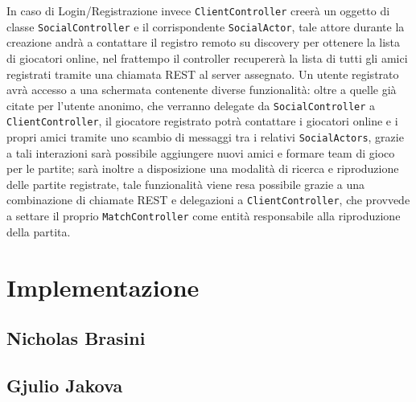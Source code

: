 In caso di Login/Registrazione invece \texttt{ClientController} creerà un oggetto di classe \texttt{SocialController} e il corrispondente \texttt{SocialActor}, tale attore durante la creazione andrà a contattare il registro remoto su discovery per ottenere la lista di giocatori online, nel frattempo il controller recupererà la lista di tutti gli amici registrati tramite una chiamata REST al server assegnato. Un utente registrato avrà accesso a una schermata contenente diverse funzionalità: oltre a quelle già citate per l'utente anonimo, che verranno delegate da \texttt{SocialController} a \texttt{ClientController}, il giocatore registrato potrà contattare i giocatori online e i propri amici tramite uno scambio di messaggi tra i relativi \texttt{SocialActors}, grazie a tali interazioni sarà possibile aggiungere nuovi amici e formare team di gioco per le partite; sarà inoltre a disposizione una modalità di ricerca e riproduzione delle partite registrate, tale funzionalità viene resa possibile grazie a una combinazione di chiamate REST e delegazioni a \texttt{ClientController}, che provvede a settare il proprio \texttt{MatchController} come entità responsabile alla riproduzione della partita.    
  
\clearpage

    \section{Implementazione}\label{sec:implementation}
        \subsection{Nicholas Brasini}\label{subsec:brasini}
        \subsection{Gjulio Jakova}\label{subsec:jakova}

